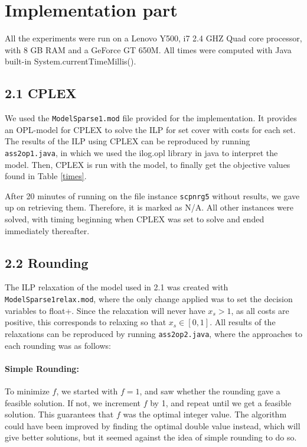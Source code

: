 \documentclass[12pt]{article}
\begin{document}
\pagebreak
\section*{Implementation part}

All the experiments were run on a Lenovo Y500, i7 2.4 GHZ Quad core processor, with 8 GB RAM and a GeForce GT 650M. All times were computed with Java built-in System.currentTimeMillis().

\subsection*{2.1 CPLEX}

We used the {\tt ModelSparse1.mod} file provided for the implementation. It provides an OPL-model for CPLEX to solve the ILP for set cover with costs for each set. The results of the ILP using CPLEX can be reproduced by running {\tt ass2op1.java}, in which we used the ilog.opl library in java to interpret the model. Then, CPLEX is run with the model, to finally get the objective values found in Table \ref{times}.

After 20 minutes of running on the file instance {\tt scpnrg5} without results, we gave up on retrieving them. Therefore, it is marked as N/A. All other instances were solved, with timing beginning when CPLEX was set to solve and ended immediately thereafter.
\subsection*{2.2 Rounding}

The ILP relaxation of the model used in 2.1 was created with {\tt ModelSparse1relax.mod}, where the only change applied was to set the decision variables to float+. Since the relaxation will never have $x_s>1$, as all costs are positive, this corresponds to relaxing so that $x_s \in \left[ 0, 1\right]$. All results of the relaxations can be reproduced by running {\tt ass2op2.java}, where the approaches to each rounding was as follows:

\paragraph{Simple Rounding:} To minimize $f$, we started with $f=1$, and saw whether the rounding gave a feasible solution. If not, we increment $f$ by 1, and repeat until we get a feasible solution. This guarantees that $f$ was the optimal integer value. The algorithm could have been improved by finding the optimal double value instead, which will give better solutions, but it seemed against the idea of simple rounding to do so.
\end{document}
